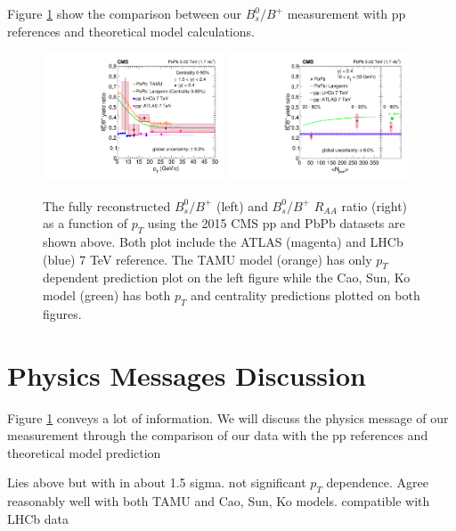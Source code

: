 Figure \ref{FinalResults} show the comparison between our $B^0_s/B^+$ measurement with pp references and theoretical model calculations. 

\begin{figure}[hbtp]
\begin{center}
\includegraphics[width=0.48\textwidth]{Figures/Chapter6/ratio_vsPt_ref1_1.pdf}
\includegraphics[width=0.48\textwidth]{Figures/Chapter6/ratio_vsCent_ref1.pdf}
\caption{The fully reconstructed $B^0_s/B^+$ (left) and $B^0_s/B^+$ $R_{AA}$ ratio (right) as a function of $p_T$ using the 2015 CMS pp and PbPb datasets are shown above. Both plot include the ATLAS (magenta) and LHCb (blue) 7 TeV reference. The TAMU model (orange) has only $p_T$ dependent prediction plot on the left figure while the Cao, Sun, Ko model (green) has both $p_T$ and centrality predictions plotted on both figures.}
\label{FinalResults}
\end{center}
\end{figure}   
 

\section{Physics Messages Discussion}

Figure \ref{FinalResults} conveys a lot of information. We will discuss the physics message of our measurement through the comparison of our data with the pp references and theoretical model prediction

Lies above but with in about 1.5 sigma. not significant $p_T$ dependence. Agree reasonably well with both TAMU and Cao, Sun, Ko models. compatible with LHCb data

